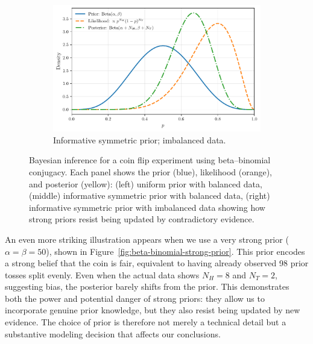 \begin{exampleBox}
\begin{figure}[H]
\begin{subfigure}[t]{0.32\textwidth}
            \includegraphics[width=\linewidth]{figs/models-vs-data/beta_binomial_informative_imbalanced.pdf}
            \caption{Informative symmetric prior; imbalanced data.}
            \label{fig:beta-binomial-informative-imbalanced}
        \end{subfigure}
        \caption{Bayesian inference for a coin flip experiment using beta--binomial conjugacy. Each panel shows the prior (blue), likelihood (orange), and posterior (yellow): (left) uniform prior with balanced data, (middle) informative symmetric prior with balanced data, (right) informative symmetric prior with imbalanced data showing how strong priors resist being updated by contradictory evidence.}
        \label{fig:beta-binomial-conjugacy}
    \end{figure}

    An even more striking illustration appears when we use a very strong prior ($\alpha = \beta = 50$), shown in Figure~\ref{fig:beta-binomial-strong-prior}. This prior encodes a strong belief that the coin is fair, equivalent to having already observed 98 prior tosses split evenly. Even when the actual data shows $N_H = 8$ and $N_T = 2$, suggesting bias, the posterior barely shifts from the prior. This demonstrates both the power and potential danger of strong priors: they allow us to incorporate genuine prior knowledge, but they also resist being updated by new evidence. The choice of prior is therefore not merely a technical detail but a substantive modeling decision that affects our conclusions.


\end{exampleBox}
